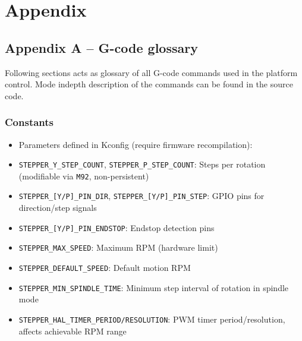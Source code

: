\chapter*{Appendix}

\section*{Appendix A -- G-code glossary}

Following sections acts as glossary of all G-code commands used in the platform control. Mode indepth description of the commands can be found in the source code.

\subsection{Constants}
\begin{itemize}
  \item Parameters defined in Kconfig (require firmware recompilation):
  \item \texttt{STEPPER\_Y\_STEP\_COUNT}, \texttt{STEPPER\_P\_STEP\_COUNT}: Steps per rotation (modifiable via \texttt{M92}, non-persistent)
  \item \texttt{STEPPER\_[Y/P]\_PIN\_DIR}, \texttt{STEPPER\_[Y/P]\_PIN\_STEP}: GPIO pins for direction/step signals
  \item \texttt{STEPPER\_[Y/P]\_PIN\_ENDSTOP}: Endstop detection pins
  \item \texttt{STEPPER\_MAX\_SPEED}: Maximum RPM (hardware limit)
  \item \texttt{STEPPER\_DEFAULT\_SPEED}: Default motion RPM
  \item \texttt{STEPPER\_MIN\_SPINDLE\_TIME}: Minimum step interval of rotation in spindle mode
  \item \texttt{STEPPER\_HAL\_TIMER\_PERIOD/RESOLUTION}: PWM timer period/resolution, affects achievable RPM range
\end{itemize}

